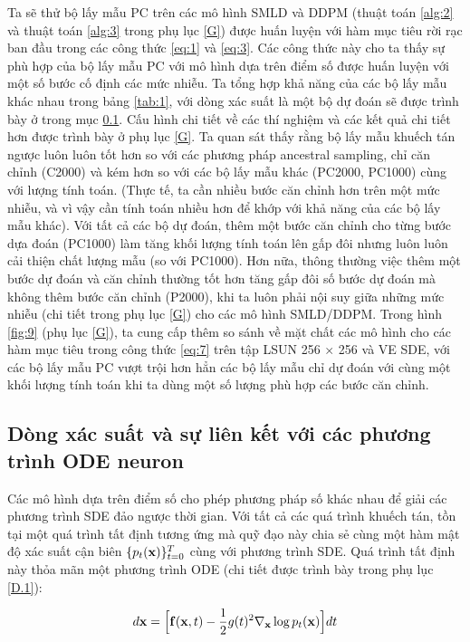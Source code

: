 \documentclass{article} %
\begin{document}
Ta sẽ thử bộ lấy mẫu PC trên các mô hình SMLD và DDPM (thuật toán \ref{alg:2} và thuật toán \ref{alg:3} trong phụ lục \ref{G}) được huấn luyện với hàm mục tiêu rời rạc ban đầu trong các công thức \ref{eq:1} và \ref{eq:3}.
Các công thức này cho ta thấy sự phù hợp của bộ lấy mẫu PC với mô hình dựa trên điểm số được huấn luyện với một số bước cố định các mức nhiễu.
Ta tổng hợp khả năng của các bộ lấy mẫu khác nhau trong bảng \ref{tab:1}, với dòng xác suất là một bộ dự đoán sẽ được trình bày ở trong mục \ref{4.3}.
Cấu hình chi tiết về các thí nghiệm và các kết quả chi tiết hơn được trình bày ở phụ lục \ref{G}.
Ta quan sát thấy rằng bộ lấy mẫu khuếch tán ngược luôn luôn tốt hơn so với các phương pháp ancestral sampling, chỉ căn chỉnh (C2000) và kém hơn so với các bộ lấy mẫu khác (PC2000, PC1000) cùng với lượng tính toán.
(Thực tế, ta cần nhiều bước căn chỉnh hơn trên một mức nhiễu, và vì vậy cần tính toán nhiều hơn để khớp với khả năng của các bộ lấy mẫu khác).
Với tất cả các bộ dự đoán, thêm một bước căn chỉnh cho từng bước dựa đoán (PC1000) làm tăng khối lượng tính toán lên gấp đôi nhưng luôn luôn cải thiện chất lượng mẫu (so với PC1000).
Hơn nữa, thông thường việc thêm một bước dự đoán và căn chỉnh thường tốt hơn tăng gấp đôi số bước dự đoán mà không thêm bước căn chỉnh (P2000),
khi ta luôn phải nội suy giữa những mức nhiễu (chi tiết trong phụ lục \ref{G}) cho các mô hình SMLD/DDPM.
Trong hình \ref{fig:9} (phụ lục \ref{G}), ta cung cấp thêm so sánh về mặt chất các mô hình cho các hàm mục tiêu trong công thức \ref{eq:7} trên tập LSUN 256 $\times$ 256 và VE SDE, với các bộ lấy mẫu PC vượt trội hơn hẳn các bộ lấy mẫu chỉ dự đoán với cùng một khối lượng tính toán khi ta dùng một số lượng phù hợp các bước căn chỉnh.

\subsection{Dòng xác suất và sự liên kết với các phương trình ODE neuron} \label{4.3}

Các mô hình dựa trên điểm số cho phép phương pháp số khác nhau để giải các phương trình SDE đảo ngược thời gian.
Với tất cả các quá trình khuếch tán, tồn tại một quá trình tất định tương ứng mà quỹ đạo này chia sẻ cùng một hàm mật độ xác suất cận biên $\lbrace p_t (\bold{x}) \rbrace_{t=0}^T$ cùng với phương trình SDE.
Quá trình tất định này thỏa mãn một phương trình ODE (chi tiết được trình bày trong phụ lục \ref{D.1}):

\begin{equation} \label{eq:13}
    d \bold{x} = \Big \lbrack \bold{f}(\bold{x}, t) - \dfrac{1}{2}g(t)^2 \nabla_{\bold{x}} \log p_t (\bold{x}) \Big \rbrack dt
\end{equation}
\end{document}

